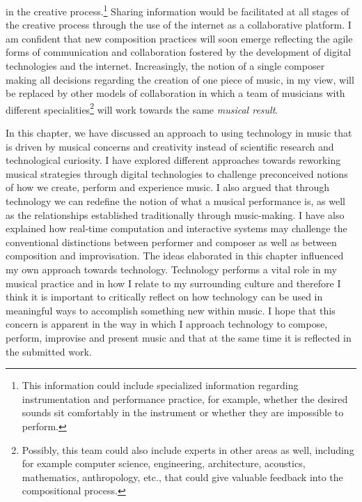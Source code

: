 in the creative process.\footnote{This information could include specialized information regarding instrumentation and performance practice, for example, whether the desired sounds sit comfortably in the instrument or whether they are impossible to perform.} Sharing information would be facilitated at all stages of the creative process through the use of the internet as a collaborative platform. I am confident that new composition practices will soon emerge reflecting the agile forms of communication and collaboration fostered by the development of digital technologies and the internet. Increasingly, the notion of a single composer making all decisions regarding the creation of one piece of music, in my view, will be replaced by other models of collaboration in which a team of musicians with different specialities\footnote{Possibly, this team could also include experts in other areas as well, including for example computer science, engineering, architecture, acoustics, mathematics, anthropology, etc., that could give valuable feedback into the compositional process.} will work towards the same \emph{musical result}.

\indent

In this chapter, we have discussed an approach to using technology in music that is driven by musical concerns and creativity instead of scientific research and technological curiosity. I have explored different approaches towards reworking musical strategies through digital technologies to challenge preconceived notions of how we create, perform and experience music. I also argued that through technology we can redefine the notion of what a musical performance is, as well as the relationships established traditionally through music-making. I have also explained how real-time computation and interactive systems may challenge the conventional distinctions between performer and composer as well as between composition and improvisation. The ideas elaborated in this chapter influenced my own approach towards technology. Technology performs a vital role in my musical practice and in how I relate to my surrounding culture and therefore I think it is important to critically reflect on how technology can be used in meaningful ways to accomplish something new within music. I hope that this concern is apparent in the way in which I approach technology to compose, perform, improvise and present music and that at the same time it is reflected in the submitted work.

\label{ch:strategies}